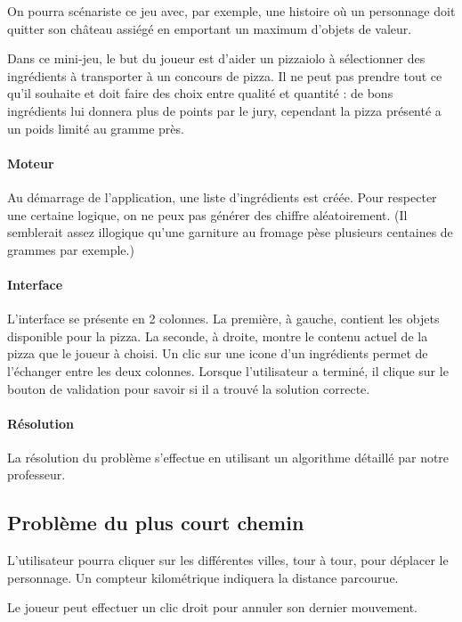         On pourra scénariste ce jeu avec, par exemple, une histoire où un personnage
        doit quitter son château assiégé en emportant un maximum d'objets de valeur.


            Dans ce mini-jeu, le but du joueur est d'aider un pizzaiolo à
            sélectionner des ingrédients à transporter à un concours de pizza.
            Il ne peut pas prendre tout ce qu'il souhaite et doit faire des
            choix entre qualité et quantité : de bons ingrédients lui donnera
            plus de points par le jury, cependant la pizza présenté a un poids
            limité au gramme près.
        \paragraph{Moteur}
            Au démarrage de l'application, une liste d'ingrédients est créée.
            Pour respecter une certaine logique, on ne peux pas générer des
            chiffre aléatoirement. (Il semblerait assez illogique qu'une
            garniture au fromage pèse plusieurs centaines de grammes par
            exemple.)
        \paragraph{Interface}
            L'interface se présente en 2 colonnes. La première, à gauche,
            contient les objets disponible pour la pizza. La seconde, à droite,
            montre le contenu actuel de la pizza que le joueur à choisi.
            Un clic sur une icone d'un ingrédients permet de l'échanger entre
            les deux colonnes.
            Lorsque l'utilisateur a terminé, il clique sur le bouton de
            validation pour savoir si il a trouvé la solution correcte.
        \paragraph{Résolution}
            La résolution du problème s'effectue en utilisant un algorithme
            détaillé par notre professeur.


\subsection{Problème du plus court chemin}
        L'utilisateur pourra cliquer sur les différentes villes, tour à tour,
        pour déplacer le personnage. Un compteur kilométrique indiquera la
        distance parcourue.

        Le joueur peut effectuer un clic droit pour annuler son dernier
        mouvement.

